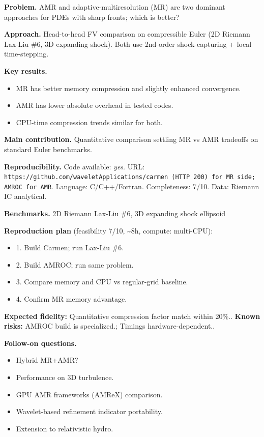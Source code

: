 \documentclass[10pt,letterpaper]{article}
\begin{document}
\textbf{Problem.} AMR and adaptive-multiresolution (MR) are two dominant approaches for PDEs with sharp fronts; which is better?

\textbf{Approach.} Head-to-head FV comparison on compressible Euler (2D Riemann Lax-Liu \#6, 3D expanding shock). Both use 2nd-order shock-capturing + local time-stepping.

\textbf{Key results.}
\begin{itemize}
\item MR has better memory compression and slightly enhanced convergence.
\item AMR has lower absolute overhead in tested codes.
\item CPU-time compression trends similar for both.
\end{itemize}

\textbf{Main contribution.} Quantitative comparison settling MR vs AMR tradeoffs on standard Euler benchmarks.

\textbf{Reproducibility.} Code available: \emph{yes}. URL: \texttt{https://github.com/waveletApplications/carmen (HTTP 200) for MR side; AMROC for AMR}. Language: C/C++/Fortran. Completeness: 7/10. Data: Riemann IC analytical.

\textbf{Benchmarks.} 2D Riemann Lax-Liu \#6, 3D expanding shock ellipsoid

\textbf{Reproduction plan} (feasibility 7/10, \textasciitilde8h, compute: multi-CPU):
\begin{itemize}
\item 1. Build Carmen; run Lax-Liu \#6.
\item 2. Build AMROC; run same problem.
\item 3. Compare memory and CPU vs regular-grid baseline.
\item 4. Confirm MR memory advantage.
\end{itemize}
\textbf{Expected fidelity:} Quantitative compression factor match within 20\%.. \textbf{Known risks:} AMROC build is specialized.; Timings hardware-dependent..

\textbf{Follow-on questions.}
\begin{itemize}
\item Hybrid MR+AMR?
\item Performance on 3D turbulence.
\item GPU AMR frameworks (AMReX) comparison.
\item Wavelet-based refinement indicator portability.
\item Extension to relativistic hydro.
\end{itemize}
\end{document}
